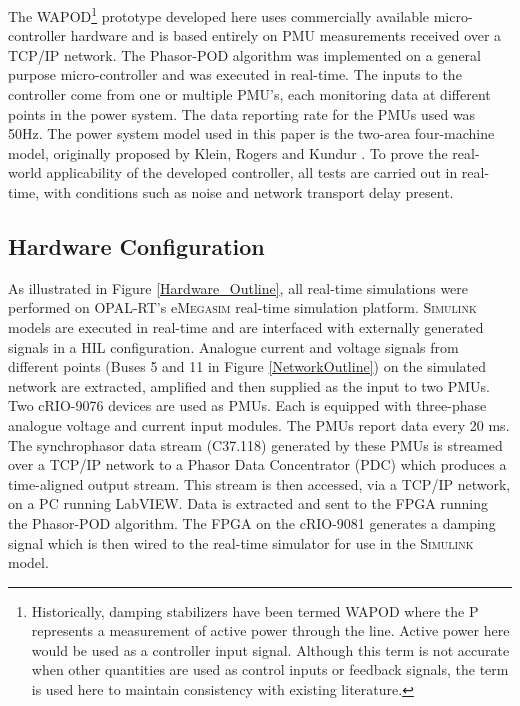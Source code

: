\documentclass[journal]{IEEEtran}
\begin{document}
The WAPOD\footnote{Historically, damping stabilizers have been termed WAPOD where the P represents a measurement of active power through the line. Active power here would be used as a controller input signal. Although this term is not accurate when other quantities are used as control inputs or feedback signals, the term is used here to maintain consistency with existing literature.} prototype developed here uses commercially available micro-controller hardware and is based entirely on PMU measurements received over a TCP/IP network. The Phasor-POD algorithm \cite{PhasorPOD} was implemented on a general purpose micro-controller and was executed in real-time. The inputs to the controller come from one or multiple PMU's, each monitoring data at different points in the power system. The data reporting rate for the PMUs used was 50Hz. The power system model used in this paper is the two-area four-machine model, originally proposed by Klein, Rogers and Kundur \cite{KundurTwoArea}. To prove the real-world applicability of the developed controller, all tests are carried out in real-time, with conditions such as noise and network transport delay present.

\subsection{Hardware Configuration}
As illustrated in Figure \ref {Hardware_Outline}, all real-time simulations were performed on OPAL-RT's e\textsc{Megasim} \cite{eMEGASIM} real-time simulation platform. \textsc{Simulink} models are executed in real-time and are interfaced with externally generated signals in a HIL configuration. Analogue current and voltage signals from different points (Buses 5 and 11 in Figure \ref{NetworkOutline}) on the simulated network are extracted, amplified and then supplied as the input to two PMUs. Two cRIO-9076 \cite{cRIO9081} devices are used as PMUs. Each is equipped with three-phase analogue voltage and current input modules. The PMUs report data every 20 ms. The synchrophasor data stream (C37.118) generated by these PMUs is streamed over a TCP/IP network to a Phasor Data Concentrator (PDC) which produces a time-aligned output stream. This stream is then accessed, via a TCP/IP network, on a PC running LabVIEW. Data is extracted and sent to the FPGA running the Phasor-POD algorithm. The FPGA on the cRIO-9081 \cite{cRIO9081} generates a damping signal which is then wired to the real-time simulator for use in the \textsc{Simulink} model.
\end{document}
